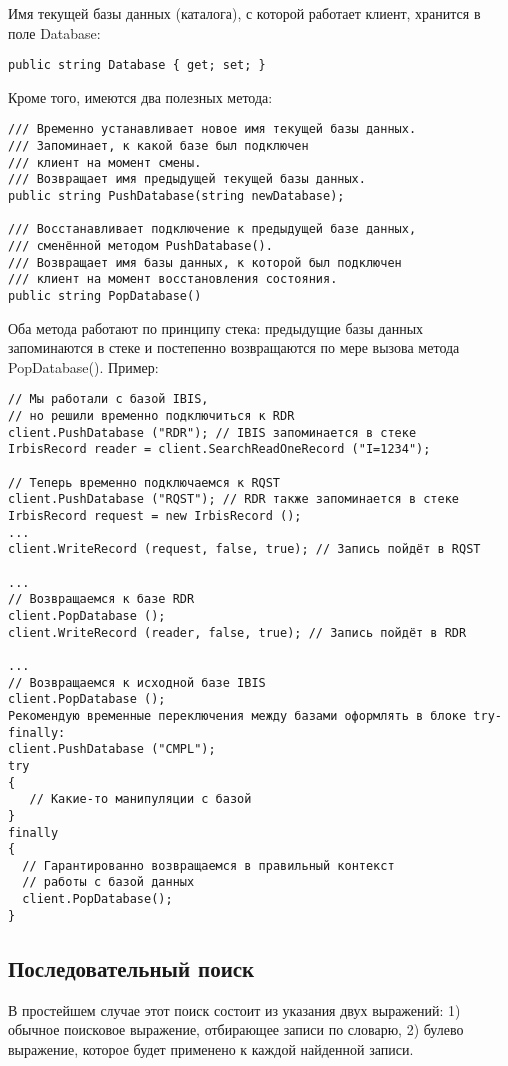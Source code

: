 Имя текущей базы данных (каталога), с которой работает клиент, хранится в поле Database:
\begin{lstlisting}
public string Database { get; set; }
\end{lstlisting}
Кроме того, имеются два полезных метода:
\begin{lstlisting}
/// Временно устанавливает новое имя текущей базы данных.
/// Запоминает, к какой базе был подключен
/// клиент на момент смены.
/// Возвращает имя предыдущей текущей базы данных.
public string PushDatabase(string newDatabase);

/// Восстанавливает подключение к предыдущей базе данных,
/// сменённой методом PushDatabase().
/// Возвращает имя базы данных, к которой был подключен 
/// клиент на момент восстановления состояния.
public string PopDatabase()
\end{lstlisting}
Оба метода работают по принципу стека: предыдущие базы данных запоминаются в стеке и постепенно возвращаются по мере вызова метода PopDatabase(). Пример:
\begin{lstlisting}
// Мы работали с базой IBIS, 
// но решили временно подключиться к RDR
client.PushDatabase ("RDR"); // IBIS запоминается в стеке
IrbisRecord reader = client.SearchReadOneRecord ("I=1234");

// Теперь временно подключаемся к RQST
client.PushDatabase ("RQST"); // RDR также запоминается в стеке
IrbisRecord request = new IrbisRecord ();
...
client.WriteRecord (request, false, true); // Запись пойдёт в RQST

...
// Возвращаемся к базе RDR
client.PopDatabase ();
client.WriteRecord (reader, false, true); // Запись пойдёт в RDR

...
// Возвращаемся к исходной базе IBIS
client.PopDatabase ();
Рекомендую временные переключения между базами оформлять в блоке try-finally: 
client.PushDatabase ("CMPL");
try
{
   // Какие-то манипуляции с базой
}
finally
{
  // Гарантированно возвращаемся в правильный контекст
  // работы с базой данных
  client.PopDatabase();
}
\end{lstlisting}

\subsection{Последовательный поиск}

В простейшем случае этот поиск состоит из указания двух выражений: 1) обычное поисковое выражение, отбирающее записи по словарю, 2) булево выражение, которое будет применено к каждой найденной записи. 

